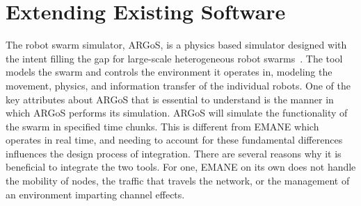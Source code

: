 \section{Extending Existing Software}
The robot swarm simulator, ARGoS, is a physics based simulator designed with the intent filling the gap for large-scale heterogeneous robot swarms~\cite{argos}.
The tool models the swarm and controls the environment it operates in, modeling the movement, physics, and information transfer of the individual robots.
One of the key attributes about ARGoS that is essential to understand is the manner in which ARGoS performs its simulation.
ARGoS will simulate the functionality of the swarm in specified time chunks.
This is different from EMANE which operates in real time, and needing to account for these fundamental differences influences the design process of integration.
There are several reasons why it is beneficial to integrate the two tools.
For one, EMANE on its own does not handle the mobility of nodes, the traffic that travels the network, or the management of an environment imparting channel effects.

